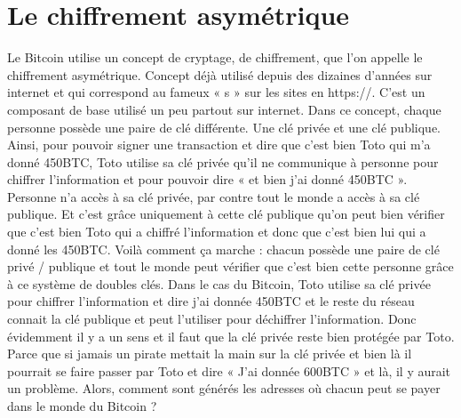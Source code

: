 \documentclass{bredele} %
\begin{document}
    \section*{Le chiffrement asymétrique}
    Le Bitcoin utilise un concept de cryptage, de chiffrement, que l’on appelle le chiffrement asymétrique. Concept déjà utilisé depuis des dizaines d’années sur internet et qui correspond au fameux « s » sur les sites en https://. C’est un composant de base utilisé un peu partout sur internet.
    \newline
    Dans ce concept, chaque personne possède une paire de clé différente. Une clé privée et une clé publique.
    \newline
    Ainsi, pour pouvoir signer une transaction et dire que c’est bien Toto qui m’a donné 450BTC, Toto utilise sa clé privée qu’il ne communique à personne pour chiffrer l’information et pour pouvoir dire « et bien j’ai donné 450BTC ». Personne n’a accès à sa clé privée, par contre tout le monde a accès à sa clé publique. Et c’est grâce uniquement à cette clé publique qu’on peut bien vérifier que c’est bien Toto qui a chiffré l’information et donc que c’est bien lui qui a donné les 450BTC.
    \newline
    Voilà comment ça marche : chacun possède une paire de clé privé / publique et tout le monde peut vérifier que c’est bien cette personne grâce à ce système de doubles clés.
\newline
    \newline
    Dans le cas du Bitcoin, Toto utilise sa clé privée pour chiffrer l’information et dire j’ai donnée 450BTC et le reste du réseau connait la clé publique et peut l’utiliser pour déchiffrer l’information. Donc évidemment il y a un sens et il faut que la clé privée reste bien protégée par Toto. Parce que si jamais un pirate mettait la main sur la clé privée et bien là il pourrait se faire passer par Toto et dire « J’ai donnée 600BTC » et là, il y aurait un problème.
    \newline
    \newline
    Alors, comment sont générés les adresses où chacun peut se payer dans le monde du Bitcoin ?
\end{document}
